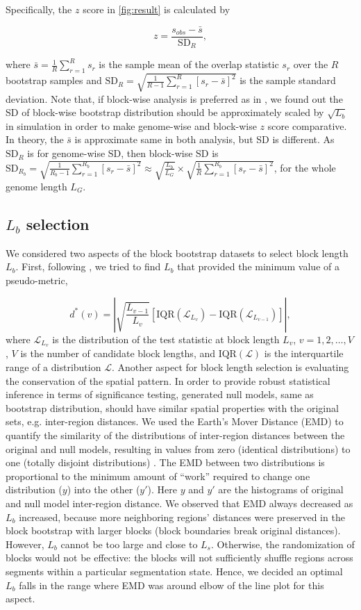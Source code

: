 \documentclass{article}
\begin{document}
Specifically, the
$z$ score in \cref{fig:result} is calculated by

$$ z = \frac{s_{obs} - \bar{s}}{ \text{SD}_R },$$

where
$\bar{s} = \frac{1}{R} \sum_{r=1}^R s_r$
is the sample mean of the overlap statistic $s_r$ over the $R$
bootstrap samples and 
$\text{SD}_R = \sqrt{\frac{1}{R-1} \sum_{r=1}^R [s_r - \bar{s}]^2}$ is
the sample standard deviation. 
Note that, if block-wise analysis is preferred as in \citet{bickel2010subsampling}, we found out the SD of block-wise bootstrap distribution should be approximately scaled by $\sqrt{L_b}$ in simulation in order to make genome-wise and block-wise $z$ score comparative. In theory, the $\bar{s}$ is approximate same in both analysis, but SD is different. As $\text{SD}_R$ is for genome-wise SD, then block-wise SD is $\text{SD}_{R_b} = \sqrt{\frac{1}{R_b-1} \sum_{r=1}^{R_b} [s_r - \bar{s}]^2}
\approx \sqrt{\frac{L_b}{L_G}} \times \sqrt{\frac{1}{R}\sum_{r=1}^{R_b} [s_r - \bar{s}]^2}$, for the whole genome length $L_G$. 


\subsection{$L_b$ selection}\label{sec:length}

We considered two aspects of the block bootstrap datasets to select
block length $L_b$.
First, following \citet{bickel2010subsampling}, we tried to find $L_b$
that provided the minimum value of a pseudo-metric,

$$ d^*(v)= \left| \sqrt{\frac{L_{v-1}}{L_v}} [\text{IQR}(\mathcal{L}_{L_v})-\text{IQR}(\mathcal{L}_{L_{v-1}})] \right|,$$
where $\mathcal{L}_{L_v}$ is the distribution of the test statistic at
block length $L_v$, $v = 1,2,\dots,V$, $V$ is the number of candidate
block lengths, and $\text{IQR}(\mathcal{L})$ is the interquartile
range of a distribution $\mathcal{L}$.
Another aspect for block length selection is evaluating the
conservation of the spatial pattern. In order to provide robust
statistical inference in terms of significance testing,
generated null models, same as bootstrap distribution, should have similar spatial properties with
the original sets, e.g. inter-region distances. 
We used the Earth's Mover
Distance (EMD) to quantify the similarity of the distributions of
inter-region distances between the original and null models, resulting 
in values from zero (identical distributions) to one (totally disjoint
distributions) \citep{emd}.
The EMD between two distributions is proportional to
the minimum amount of ``work'' required to change one distribution ($y$)
into the other ($y'$). Here $y$ and $y'$ are the histograms of
original and null model inter-region distance.
We observed that EMD always decreased as $L_b$ increased, because more
neighboring regions' distances were preserved in the
block bootstrap with larger blocks (block boundaries break original
distances).
However, $L_b$ cannot be too large and close to $L_s$.
Otherwise, the randomization of blocks would not
be effective: the blocks will not sufficiently shuffle regions across
segments within a particular segmentation state.
Hence, we decided an optimal $L_b$ falls in the range where EMD
was around elbow of the line plot for this aspect. 
\end{document}
